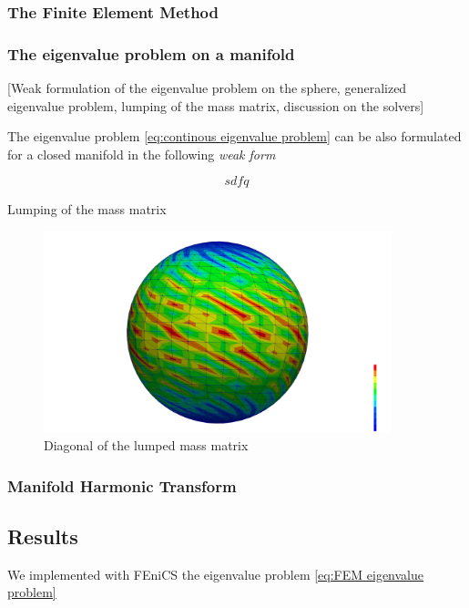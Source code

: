  \subsubsection{The Finite Element Method}
 
 
\subsubsection{The eigenvalue problem on a manifold}
[Weak formulation of the eigenvalue problem on the sphere, generalized eigenvalue problem, lumping of the mass matrix, discussion on the solvers]

The eigenvalue problem \ref{eq:continous eigenvalue problem} can be also formulated for a closed manifold in the following \textit{weak form}

\begin{equation}\label{eq:weak eigenvalue problem}
sdfq
\end{equation}

Lumping of the mass matrix
\begin{figure}[h]
	\label{fig:Lumping}
	\centering
	\includegraphics[width=0.9\textwidth]{figs/Chapter3/B_diagonal.png}
	\caption{Diagonal of the lumped mass matrix}
\end{figure}


\subsubsection{Manifold Harmonic Transform}



\subsection{Results}
\label{sec:Chapter3: Results}
We implemented with FEniCS the eigenvalue problem \ref{eq:FEM eigenvalue problem}
